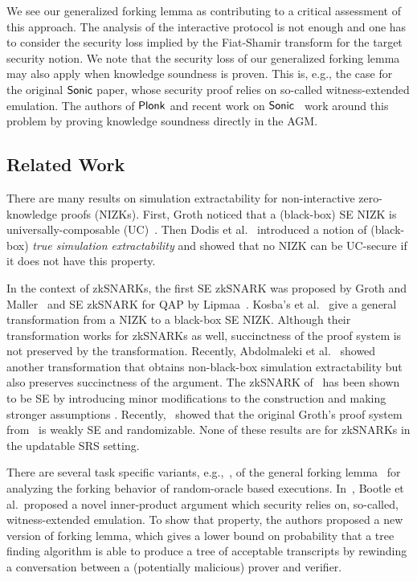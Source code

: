 We see our generalized forking lemma as contributing to a critical assessment of
this approach. The analysis of the interactive protocol is not enough and one
has to consider the security loss implied by the Fiat-Shamir transform for the target security notion.
We note that the security loss of our generalized forking lemma may also apply
when knowledge soundness is proven. This is, e.g., the case for the original
${\textnormal{\textsf{Sonic}}}$ paper, whose security proof relies on so-called witness-extended
emulation. The authors of $\textnormal{\textsf{Plonk}}$ and recent work on
${\textnormal{\textsf{Sonic}}}$~\cite{cryptoeprint:2020:1351} work around this problem by proving
knowledge soundness directly in the AGM.



\subsection{Related Work}
 

There are many results on simulation extractability for
non-interactive zero-knowledge proofs (NIZKs). First, Groth \cite{AC:Groth07}
noticed that a (black-box) SE NIZK is
universally-composable (UC)~\cite{EPRINT:Canetti00}. Then Dodis et al.~\cite{AC:DHLW10} introduced a
notion of (black-box) \emph{true simulation extractability} and showed that no
NIZK can be UC-secure if it does not have this property. 

In the context of zkSNARKs, the first
SE zkSNARK was proposed by Groth and Maller~\cite{C:GroMal17} and SE
zkSNARK for QAP by Lipmaa~\cite{EPRINT:Lipmaa19a}. 
Kosba's et
al.~\cite{EPRINT:KZMQCP15} give a general transformation from a NIZK to a
black-box SE NIZK. Although their transformation works for zkSNARKs as well,
succinctness of the proof system is not preserved by the transformation.
Recently, Abdolmaleki et al.~\cite{CCS:AbdRamSla20} showed another transformation that
obtains non-black-box simulation extractability but also preserves
succinctness of the argument. 
The zkSNARK of~\cite{EC:Groth16} has been shown to be SE by introducing minor modifications to the construction and making
stronger assumptions \cite{EPRINT:BowGab18,EPRINT:AtaBag19}. Recently,~\cite{EPRINT:BKSV20} showed that the
original Groth's proof system from~\cite{EC:Groth16} is weakly SE and
randomizable. None of these results are for zkSNARKs in the updatable SRS setting.

There are several task specific variants, e.g.,~\cite{INDOCRYPT:HerSae03,CCS:BagCheJar08,AC:BelDaiLi19}, of the general forking lemma~\cite{JC:PoiSte00,CCS:BelNev06} for analyzing the forking behavior of random-oracle based executions.
In~\cite{EC:BCCGP16}, Bootle et al.~proposed a novel inner-product argument which
security relies on, so-called, witness-extended emulation. To show that
property, the authors proposed a new version of forking lemma, which gives a
lower bound on probability that a tree finding algorithm is able to produce a 
tree of acceptable transcripts by rewinding a conversation between a
(potentially malicious) prover and verifier.

